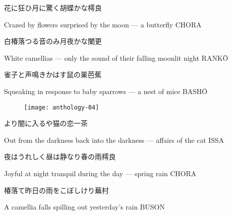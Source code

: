 \begin{haiku}
    {\FH 花に狂ひ月に驚く胡蝶かな}\hfill{\FH 樗良}

    \vin{} Crazed by flowers
    \vin{} \vin{} surprised by the moon ---
    \vin{} \vin{} \vin{} a butterfly \hspace{\fill} CHORA
\end{haiku}

\begin{haiku}
    {\FH 白椿落つる音のみ月夜かな}\hfill{\FH 闌更}

    \vin{} White camellias ---
    \vin{} \vin{} only the sound of their falling
    \vin{} \vin{} \vin{} moonlit night \hspace{\fill} RANK\={O}
\end{haiku}

\begin{haiku}
    {\FH 雀子と声鳴きかはす鼠の巣}\hfill{\FH 芭蕉}

    \vin{} Squeaking in response
    \vin{} \vin{} to baby sparrows ---
    \vin{} \vin{} \vin{} a nest of mice \hspace{\fill} BASH\={O}
\end{haiku}

\begin{figure}
    \texttt{[image: anthology-04]}
\end{figure}

\begin{haiku}
    {\FH {}より闇に入るや猫の恋}\hfill{\FH 一茶}

    \vin{} Out from the darkness
    \vin{} \vin{} back into the darkness ---
    \vin{} \vin{} \vin{} affairs of the cat \hspace{\fill} ISSA
\end{haiku}

\begin{haiku}
    {\FH 夜はうれしく昼は静なり春の雨}\hfill{\FH 樗良}

    \vin{} Joyful at night
    \vin{} \vin{} tranquil during the day ---
    \vin{} \vin{} \vin{} spring rain \hspace{\fill} CHORA
\end{haiku}

\begin{haiku}
    {\FH 椿落て昨日の雨をこぼしけり}\hfill{\FH 蕪村}

    \vin{} A camellia falls
    \vin{} \vin{} spilling out
    \vin{} \vin{} \vin{} yesterday's rain \hspace{\fill} BUSON
\end{haiku}


